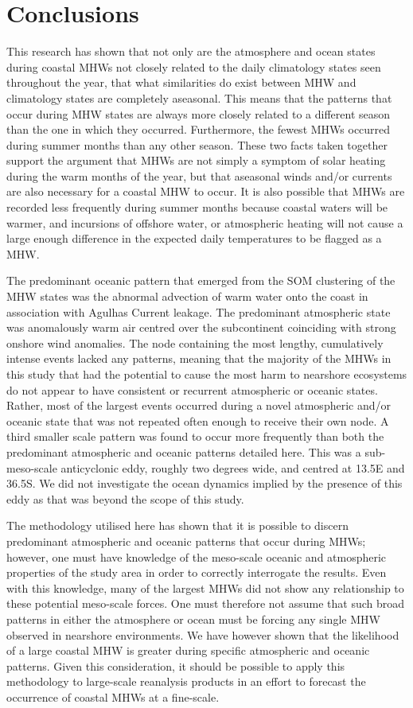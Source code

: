 \documentclass[utf8]{frontiersSCNS}
\begin{document}
\section{Conclusions}
This research has shown that not only are the atmosphere and ocean states during coastal MHWs not closely related to the daily climatology states seen throughout the year, that what similarities do exist between MHW and climatology states are completely aseasonal. This means that the patterns that occur during MHW states are always more closely related to a different season than the one in which they occurred. Furthermore, the fewest MHWs occurred during summer months than any other season. These two facts taken together support the argument that MHWs are not simply a symptom of solar heating during the warm months of the year, but that aseasonal winds and/or currents are also necessary for a coastal MHW to occur. It is also possible that MHWs are recorded less frequently during summer months because coastal waters will be warmer, and incursions of offshore water, or atmospheric heating will not cause a large enough difference in the expected daily temperatures to be flagged as a MHW.

The predominant oceanic pattern that emerged from the SOM clustering of the MHW states was the abnormal advection of warm water onto the coast in association with Agulhas Current leakage. The predominant atmospheric state was anomalously warm air centred over the subcontinent coinciding with strong onshore wind anomalies. The node containing the most lengthy, cumulatively intense events lacked any patterns, meaning that the majority of the MHWs in this study that had the potential to cause the most harm to nearshore ecosystems do not appear to have consistent or recurrent atmospheric or oceanic states. Rather, most of the largest events occurred during a novel atmospheric and/or oceanic state that was not repeated often enough to receive their own node. A third smaller scale pattern was found to occur more frequently than both the predominant atmospheric and oceanic patterns detailed here. This was a sub-meso-scale anticyclonic eddy, roughly two degrees wide, and centred at 13.5\degree E and 36.5\degree S. We did not investigate the ocean dynamics implied by the presence of this eddy as that was beyond the scope of this study.

The methodology utilised here has shown that it is possible to discern predominant atmospheric and oceanic patterns that occur during MHWs; however, one must have knowledge of the meso-scale oceanic and atmospheric properties of the study area in order to correctly interrogate the results. Even with this knowledge, many of the largest MHWs did not show any relationship to these potential meso-scale forces. One must therefore not assume that such broad patterns in either the atmosphere or ocean must be forcing any single MHW observed in nearshore environments. We have however shown that the likelihood of a large coastal MHW is greater during specific atmospheric and oceanic patterns. Given this consideration, it should be possible to apply this methodology to large-scale reanalysis products in an effort to forecast the occurrence of coastal MHWs at a fine-scale.
\end{document}
